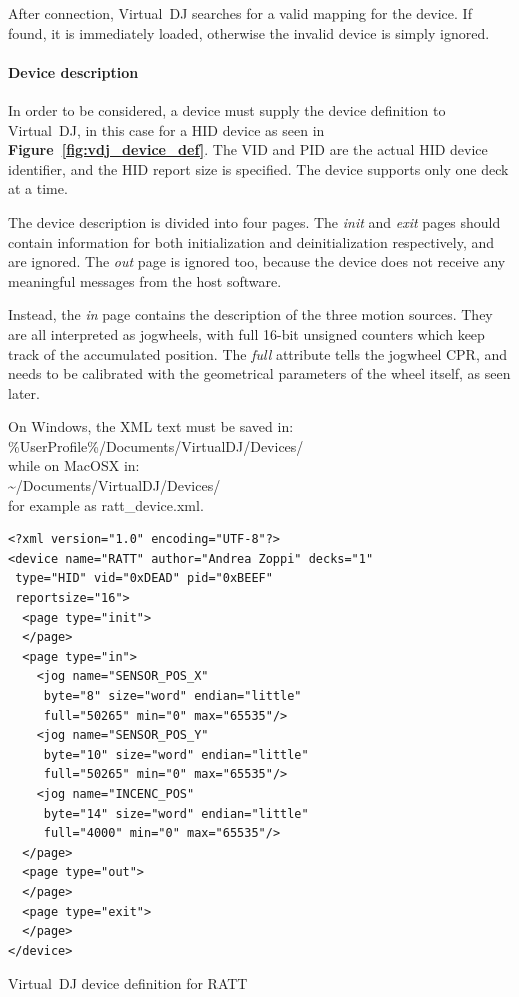 \documentclass[a4paper,10pt]{article}
\makeatletter
\newenvironment{figurehere}{\def\@captype{figure}\vspace{2ex}}{\vspace{2ex}}
\newcommand{\citef}[1]{\textbf{Figure~\ref{#1}}}
\makeatother
\begin{document}
\begin{multicols}{2}
After connection, Virtual~DJ searches for a valid mapping for the device. If
found, it is immediately loaded, otherwise the invalid device is simply
ignored.


\paragraph{Device description}
In order to be considered, a device must supply the device definition to
Virtual~DJ, in this case for a HID device \cite{vdj_hiddef} as seen in
\citef{fig:vdj_device_def}. The VID and PID are the actual HID device
identifier, and the HID report size is specified. The device supports only one
deck at a time.

The device description is divided into four pages. The \emph{init} and
\emph{exit} pages should contain information for both initialization and
deinitialization respectively, and are ignored. The \emph{out} page is ignored
too, because the device does not receive any meaningful messages from the
host software.

Instead, the \emph{in} page contains the description of the three motion
sources. They are all interpreted as jogwheels, with full 16-bit unsigned
counters which keep track of the accumulated position. The \emph{full}
attribute tells the jogwheel CPR, and needs to be calibrated with the
geometrical parameters of the wheel itself, as seen later.

On Windows, the XML text must be saved in:\\
{\ttfamily\small {\%}UserProfile{\%}/Documents/VirtualDJ/Devices/}\\
while on MacOSX in:\\
{\ttfamily\small {\textasciitilde}/Documents/VirtualDJ/Devices/}\\
for example as {\ttfamily\small ratt{\_}device.xml}.

\begin{figurehere}
\begin{mdframed}[
	innerleftmargin=4pt,
	innerrightmargin=4pt,
	innertopmargin=0pt,
	innerbottommargin=0pt
]
\begin{lstlisting}[language=simpleXML]
<?xml version="1.0" encoding="UTF-8"?>
<device name="RATT" author="Andrea Zoppi" decks="1"
 type="HID" vid="0xDEAD" pid="0xBEEF"
 reportsize="16">
  <page type="init">
  </page>
  <page type="in">
    <jog name="SENSOR_POS_X"
     byte="8" size="word" endian="little"
     full="50265" min="0" max="65535"/>
    <jog name="SENSOR_POS_Y"
     byte="10" size="word" endian="little"
     full="50265" min="0" max="65535"/>
    <jog name="INCENC_POS"
     byte="14" size="word" endian="little"
     full="4000" min="0" max="65535"/>
  </page>
  <page type="out">
  </page>
  <page type="exit">
  </page>
</device>
\end{lstlisting}
\end{mdframed}
\caption{Virtual~DJ device definition for RATT}
\label{fig:vdj_device_def}
\end{figurehere}



\end{multicols}
\end{document}
